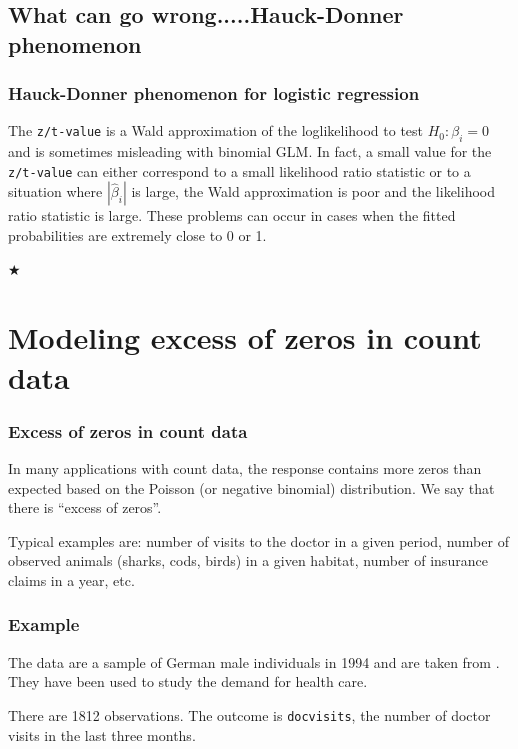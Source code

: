 \documentclass{beamer}
\newcommand{\bs}{\bigskip}
\begin{document}
\subsection{What can go wrong.....Hauck-Donner phenomenon }
\begin{frame}
\frametitle{Hauck-Donner phenomenon for logistic regression}

The \texttt{z/t-value} is a Wald
approximation of the loglikelihood to test $H_0: \beta_i=0$ and is
sometimes misleading with
binomial GLM. In fact, a small value for the \texttt{z/t-value} can
either correspond to a small likelihood ratio statistic or to a
situation where $|\hat{\beta}_i|$ is large, the Wald approximation
is poor and the likelihood ratio statistic is large.
These problems can occur in cases when the fitted probabilities are
extremely close to 0 or 1.

\bs
\bs
{\color{red} $\bigstar$ }


\end{frame}


\section{Modeling excess of zeros in count data}

\begin{frame}
\frametitle{Excess of zeros in count data}
In many applications with count data, the response contains more zeros than expected based on the Poisson (or negative binomial) distribution. We say that there is ``excess of zeros''.

\bs 
\bs 

Typical examples are: number of visits to the doctor in a given period, number
of observed animals (sharks, cods, birds) in a given habitat, number of
insurance claims in a year, etc.
\end{frame}

\begin{frame}
\frametitle{Example}

The data are a sample of German male individuals in 1994 and are taken from
. They have been used to study the demand for health
care. 

\bs
There are  1812 observations. The outcome is \texttt{docvisits}, the number of
doctor visits in the last three months.
\end{frame}
\end{document}
